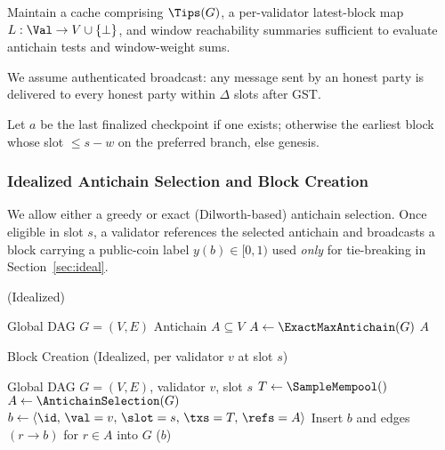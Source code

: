 \begin{definition}[\ForkChoiceUpdate]
Maintain a cache comprising $\Tips(G)$, a per-validator latest-block map $L:\Val\to V\cup\{\bot\}$, and window reachability summaries sufficient to evaluate antichain tests and window-weight sums.
\end{definition}
\begin{definition}[\Broadcast]
We assume authenticated broadcast: any message sent by an honest party is delivered to every honest party within $\Delta$ slots after GST.
\end{definition}
\begin{definition}
Let $a$ be the last finalized checkpoint if one exists; otherwise the earliest block whose slot $\le s-w$ on the preferred branch, else genesis.
\end{definition}



\subsubsection{Idealized Antichain Selection and Block Creation}
We allow either a greedy or exact (Dilworth-based) antichain selection. Once eligible in slot $s$, a validator references
the selected antichain and broadcasts a block carrying a public-coin label $y(b)\in[0,1)$ used \emph{only} for tie-breaking in Section~\ref{sec:ideal}. 



\begin{algorithm}[htbp!]
\caption{\AntichainSelection (Idealized)}
\label{alg:ideal-antichain}
\begin{algorithmic}[1]
\Require Global DAG $G=(V,E)$
\Ensure Antichain $A\subseteq V$
\State $A \gets \ExactMaxAntichain(G)$ 
\State \Return $A$
\end{algorithmic}
\end{algorithm}

\begin{algorithm}[htbp!]
\caption{Block Creation (Idealized, per validator $v$ at slot $s$)}
\label{alg:ideal-create}
\begin{algorithmic}[1]
\Require Global DAG $G=(V,E)$, validator $v$, slot $s$
  \State $T \gets \SampleMempool()$ 
  \State $A \gets \AntichainSelection(G)$
  \State $b \gets \langle \id,\,\val=v,\,\slot=s,\,\txs=T,\,\refs=A\rangle$
  \State Insert $b$ and edges $(r\to b)$ for $r\in A$ into $G$
  \State \Broadcast($b$) 
\EndIf
\end{algorithmic}
\end{algorithm}


